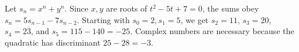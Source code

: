 Let $s_n=x^n+y^n$. Since $x,y$ are roots of $t^2-5t+7=0$, the sums obey $s_n=5s_{n-1}-7s_{n-2}$. Starting with $s_0=2,s_1=5$, we get $s_2=11$, $s_3=20$, $s_4=23$, and $s_5=115-140=\boxed{-25}$. Complex numbers are necessary because the quadratic has discriminant $25-28=-3$.

